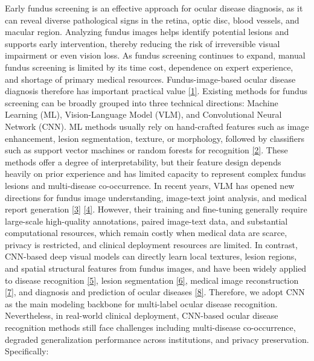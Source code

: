 Early fundus screening is an effective approach for ocular disease diagnosis, as it can reveal diverse pathological signs in the retina, optic disc, blood vessels, and macular region. Analyzing fundus images helps identify potential lesions and supports early intervention, thereby reducing the risk of irreversible visual impairment or even vision loss. As fundus screening continues to expand, manual fundus screening is limited by its time cost, dependence on expert experience, and shortage of primary medical resources. Fundus-image-based ocular disease diagnosis therefore has important practical value \hyperref[_Ref213949315]{{[}1{]}}. Existing methods for fundus screening can be broadly grouped into three technical directions: Machine Learning (ML), Vision-Language Model (VLM), and Convolutional Neural Network (CNN). ML methods usually rely on hand-crafted features such as image enhancement, lesion segmentation, texture, or morphology, followed by classifiers such as support vector machines or random forests for recognition \hyperref[_RefRahman2022MLFundus]{{[}2{]}}. These methods offer a degree of interpretability, but their feature design depends heavily on prior experience and has limited capacity to represent complex fundus lesions and multi-disease co-occurrence. In recent years, VLM has opened new directions for fundus image understanding, image-text joint analysis, and medical report generation \hyperref[_RefLim2024VLVOphthalmology]{{[}3{]}} \hyperref[_RefUrooj2025LLMMedicalImage]{{[}4{]}}. However, their training and fine-tuning generally require large-scale high-quality annotations, paired image-text data, and substantial computational resources, which remain costly when medical data are scarce, privacy is restricted, and clinical deployment resources are limited. In contrast, CNN-based deep visual models can directly learn local textures, lesion regions, and spatial structural features from fundus images, and have been widely applied to disease recognition \hyperref[_Ref213871637]{{[}5{]}}, lesion segmentation \hyperref[_Ref213948625]{{[}6{]}}, medical image reconstruction \hyperref[_Ref213948898]{{[}7{]}}, and diagnosis and prediction of ocular diseases \hyperref[_Ref213949262]{{[}8{]}}. Therefore, we adopt CNN as the main modeling backbone for multi-label ocular disease recognition. Nevertheless, in real-world clinical deployment, CNN-based ocular disease recognition methods still face challenges including multi-disease co-occurrence, degraded generalization performance across institutions, and privacy preservation. Specifically:

